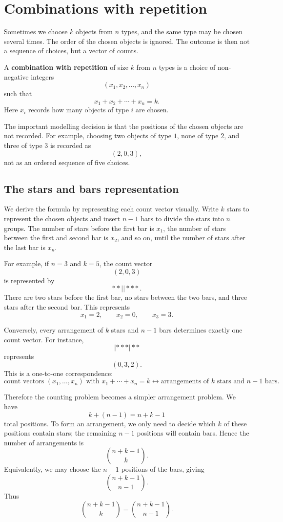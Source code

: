 \section{Combinations with repetition}

Sometimes we choose \(k\) objects from \(n\) types, and the same type may be chosen several times. The order of the chosen objects is ignored. The outcome is then not a sequence of choices, but a vector of counts.

\begin{definitionbox}
A \textbf{combination with repetition} of size \(k\) from \(n\) types is a choice of non-negative integers
\[
(x_1,x_2,\ldots,x_n)
\]
such that
\[
x_1+x_2+\cdots+x_n=k.
\]
Here \(x_i\) records how many objects of type \(i\) are chosen.
\end{definitionbox}

The important modelling decision is that the positions of the chosen objects are not recorded. For example, choosing two objects of type \(1\), none of type \(2\), and three of type \(3\) is recorded as
\[
(2,0,3),
\]
not as an ordered sequence of five choices.

\subsection*{The stars and bars representation}

We derive the formula by representing each count vector visually. Write \(k\) stars to represent the chosen objects and insert \(n-1\) bars to divide the stars into \(n\) groups. The number of stars before the first bar is \(x_1\), the number of stars between the first and second bar is \(x_2\), and so on, until the number of stars after the last bar is \(x_n\).

For example, if \(n=3\) and \(k=5\), the count vector
\[
(2,0,3)
\]
is represented by
\[
**||***.
\]
There are two stars before the first bar, no stars between the two bars, and three stars after the second bar. This represents
\[
x_1=2,\qquad x_2=0,\qquad x_3=3.
\]

Conversely, every arrangement of \(k\) stars and \(n-1\) bars determines exactly one count vector. For instance,
\[
|***|**
\]
represents
\[
(0,3,2).
\]
This is a one-to-one correspondence:
\[
\text{count vectors }(x_1,\ldots,x_n)\text{ with }x_1+\cdots+x_n=k
\longleftrightarrow
\text{arrangements of }k\text{ stars and }n-1\text{ bars}.
\]

Therefore the counting problem becomes a simpler arrangement problem. We have
\[
k+(n-1)=n+k-1
\]
total positions. To form an arrangement, we only need to decide which \(k\) of these positions contain stars; the remaining \(n-1\) positions will contain bars. Hence the number of arrangements is
\[
\binom{n+k-1}{k}.
\]
Equivalently, we may choose the \(n-1\) positions of the bars, giving
\[
\binom{n+k-1}{n-1}.
\]
Thus
\[
\binom{n+k-1}{k}=\binom{n+k-1}{n-1}.
\]

